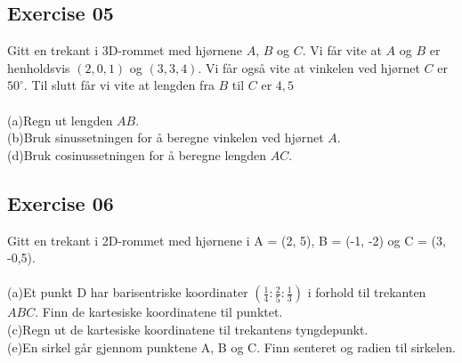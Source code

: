 \documentclass[12pt, a4paper]{article}
\begin{document}
\subsection*{Exercise 05}
Gitt en trekant i 3D-rommet med hjørnene $A$, $B$ og $C$.
Vi får vite at $A$ og $B$ er henholdsvis $(2, 0, 1)$ og
$(3, 3, 4)$. Vi får også vite at vinkelen ved hjørnet $C$ er $50^\circ$. Til slutt får vi vite at lengden fra $B$ til $C$ er 
$4,5$\\\\
	(a)\quad Regn ut lengden $AB$.
			\begin{equation}
				\tag*{}
			\end{equation}
	(b)\quad Bruk sinussetningen for å beregne vinkelen
	ved hjørnet $A$.
			\begin{equation}
				\tag*{}
			\end{equation}
	(d)\quad Bruk cosinussetningen for å beregne lengden $AC$.
			\begin{equation}
				\tag*{}
			\end{equation}

\newpage\quad
\subsection*{Exercise 06}
Gitt en trekant i 2D-rommet med hjørnene i A = (2, 5),
	B = (-1, -2) og C = (3, -0,5).\\\\
	(a)\quad Et punkt D har barisentriske koordinater $
		\left(\frac{1}{4}:\frac{2}{5}:\frac{1}{3}\right)
	$ i forhold til trekanten $ABC$. Finn de kartesiske 
	koordinatene til punktet.
			\begin{equation}
				\tag*{}
			\end{equation}
	(c)\quad Regn ut de kartesiske koordinatene til trekantens
	tyngdepunkt.
			\begin{equation}
				\tag*{}
			\end{equation}
	(e)\quad En sirkel går gjennom punktene A, B og C.
	Finn senteret og radien til sirkelen.
			\begin{equation}
				\tag*{}
			\end{equation}
\end{document}
